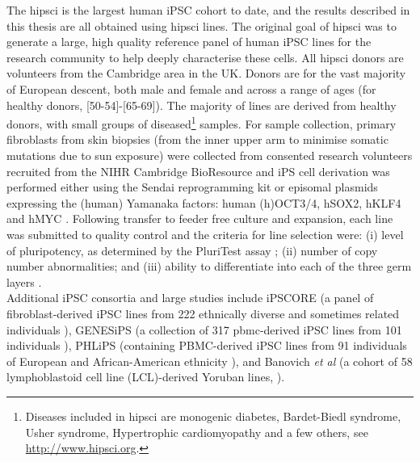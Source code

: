 The \gls{hipsci} \cite{kilpinen2017common} is the largest human iPSC cohort to date, and the results described in this thesis are all obtained using \gls{hipsci} lines.
The original goal of \gls{hipsci} was to generate a large, high quality reference panel of human iPSC lines for the research community to help deeply characterise these cells. 
All \gls{hipsci} donors are volunteers from the Cambridge area in the UK. 
Donors are for the vast majority of European descent, both male and female and across a range of ages (for healthy donors, [50-54]-[65-69]).
The majority of lines are derived from healthy donors, with small groups of diseased\footnote{Diseases included in \gls{hipsci} are monogenic diabetes, Bardet-Biedl syndrome, Usher syndrome, Hypertrophic cardiomyopathy and a few others, see \url{http://www.hipsci.org}.} samples.
For sample collection, primary fibroblasts from skin biopsies (from the inner upper arm to minimise somatic mutations due to sun exposure) were collected from consented research volunteers recruited from the NIHR Cambridge BioResource and iPS cell derivation was performed either using the Sendai reprogramming kit or episomal plasmids expressing the (human) Yamanaka factors: human (h)OCT3/4, hSOX2, hKLF4 and hMYC \cite{yu2009human}.
Following transfer to feeder free culture and expansion, each line was submitted to quality control and the criteria for line selection were: (i) level of pluripotency, as determined by the PluriTest assay \cite{muller2011bioinformatic}; (ii) number of copy number abnormalities; and (iii) ability to differentiate into each of the three germ layers \cite{kilpinen2017common}. \\




Additional iPSC consortia and large studies include
iPSCORE (a panel of fibroblast-derived iPSC lines from 222 ethnically diverse and sometimes related individuals \cite{panopoulos2017ipscore}), GENESiPS (a collection of 317 \gls{pbmc}-derived iPSC lines from 101 individuals \cite{carcamo2017analysis}), PHLiPS (containing PBMC-derived iPSC lines from 91 individuals of European and African-American ethnicity \cite{pashos2017large}), and Banovich \textit{et al} (a cohort of 58 lymphoblastoid cell line (LCL)-derived Yoruban lines, \cite{banovich2018impact}).

